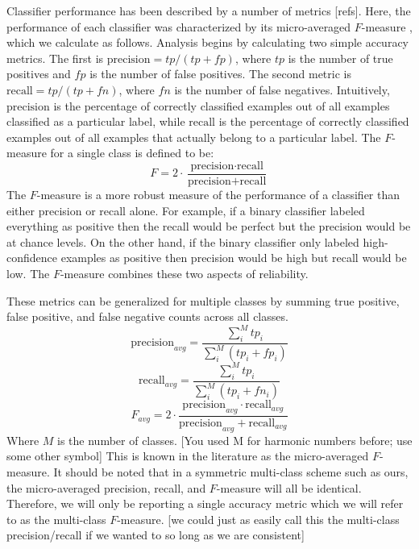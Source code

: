 \documentclass[preprint,authoryear,12pt]{elsarticle}
\begin{document}
Classifier performance has been described by a number of metrics [refs]. 
Here, the performance of each classifier was characterized by its micro-averaged $F$-measure \citep{Ozgur2005}, which we calculate as follows. 
Analysis begins by calculating two simple accuracy metrics.
The first is $\mbox{precision} = tp / (tp + fp)$, where $tp$ is the number of true positives and $fp$ is the number of false positives.
The second metric is $\mbox{recall} = tp / (tp + fn)$, where $fn$ is the number of false negatives.
Intuitively, $\mbox{precision}$ is the percentage of correctly classified examples out of all examples classified as a particular label, while $\mbox{recall}$ is the percentage of correctly classified examples out of all examples that actually belong to a particular label.
The $F$-measure for a single class is defined to be:
\begin{equation}
F = 2 \cdot \frac{\mbox{precision} \cdot \mbox{recall}}{\mbox{precision} + \mbox{recall}}
\label{eqn:f1}
\end{equation}
The $F$-measure is a more robust measure of the performance of a classifier than either precision or recall alone.
For example, if a binary classifier labeled everything as positive then the recall would be perfect but the precision would be at chance levels.
On the other hand, if the binary classifier only labeled high-confidence examples as positive then precision would be high but recall would be low.
The $F$-measure combines these two aspects of reliability.

These metrics can be generalized for multiple classes by summing true positive, false positive, and false negative counts across all classes.
\begin{equation}
\mbox{precision}_{avg} =\frac{\sum_{i}^{M}{tp_{i}}}{\sum_{i}^{M}{\left( tp_{i} + fp_{i} \right)}}
\end{equation}
\begin{equation}
\mbox{recall}_{avg} = \frac{\sum_{i}^{M}{tp_{i}}}{\sum_{i}^{M}{\left( tp_{i} + fn_{i} \right)}}
\end{equation}
\begin{equation}
F_{avg} = 2 \cdot \frac{\mbox{precision}_{avg} \cdot \mbox{recall}_{avg}}{\mbox{precision}_{avg} + \mbox{recall}_{avg}}
\end{equation}
Where $M$ is the number of classes. [You used M for harmonic numbers before; use some other symbol]
This is known in the literature as the  micro-averaged $F$-measure.
It should be noted that in a symmetric multi-class scheme such as ours, the micro-averaged precision, recall, and $F$-measure will all be identical. 
Therefore, we will only be reporting a single accuracy metric which we will refer to as the multi-class $F$-measure. 
[we could just as easily call this the multi-class precision/recall if we wanted to so long as we are consistent]
\end{document}

